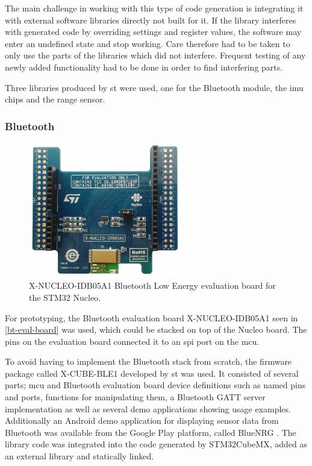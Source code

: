 The main challenge in working with this type of code generation is integrating it with external software libraries directly not built for it. If the library interferes with generated code by overriding settings and register values, the software may enter an undefined state and stop working. Care therefore had to be taken to only use the parts of the libraries which did not interfere. Frequent testing of any newly added functionality had to be done in order to find interfering parts.

Three libraries produced by \gls{st} were used, one for the Bluetooth module, the \gls{imu} chips and the range sensor.

\subsubsection{Bluetooth}
\label{bluetooth}

\begin{figure}[H]
\centering
\includegraphics[width=0.6\textwidth]{Figures/x-nucleo-idb05a1.jpg}
\caption{X-NUCLEO-IDB05A1 Bluetooth Low Energy evaluation board for the STM32 Nucleo.}
\label{bt-eval-board}
\end{figure}

For prototyping, the Bluetooth evaluation board X-NUCLEO-IDB05A1 \cite{x-nucleo-idb05a1} seen in \autoref{bt-eval-board} was used, which could be stacked on top of the Nucleo board. The pins on the evaluation board connected it to an \gls{spi} port on the \gls{mcu}.

To avoid having to implement the Bluetooth stack from scratch, the firmware package called X-CUBE-BLE1 \cite{x-cube-ble1} developed by \gls{st} was used. It consisted of several parts; \gls{mcu} and Bluetooth evaluation board device definitions such as named pins and ports, functions for manipulating them, a Bluetooth GATT server implementation as well as several demo applications showing usage examples. Additionally an Android demo application for displaying sensor data from Bluetooth was available from the Google Play platform, called BlueNRG \cite{bluenrg-app}. The library code was integrated into the code generated by STM32CubeMX, added as an external library and statically linked.

